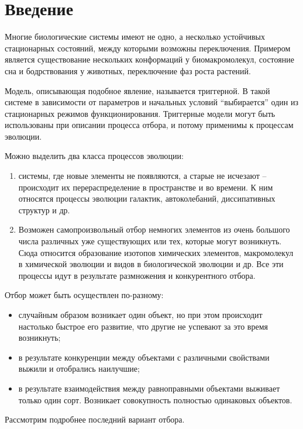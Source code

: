 \section*{Введение}

Многие биологические системы имеют не одно, а несколько устойчивых стационарных
состояний, между которыми возможны переключения. Примером является
существование нескольких конформаций у биомакромолекул, состояние сна и
бодрствования у животных, переключение фаз роста растений.

Модель, описывающая подобное явление, называется триггерной. В такой системе
в зависимости от параметров и начальных условий ``выбирается'' один из
стационарных режимов функционирования. Триггерные модели могут быть
использованы при описании процесса отбора, и потому применимы к процессам
эволюции.

Можно выделить два класса процессов эволюции:
\begin{enumerate}
    \item системы, где новые элементы не появляются, а старые не исчезают --
    происходит их перераспределение в пространстве и во времени. К ним
    относятся процессы эволюции галактик, автоколебаний, диссипативных структур
    и др.
    \item Возможен самопроизвольный отбор немногих элементов из очень большого
    числа различных уже существующих или тех, которые могут возникнуть. Сюда
    относится образование изотопов химических элементов, макромолекул в
    химической эволюции и видов в биологической эволюции и др. Все эти процессы
    идут в результате размножения и конкурентного отбора.
\end{enumerate}

Отбор может быть осуществлен по-разному:
\begin{itemize}
    \item случайным образом возникает один объект, но при этом происходит
    настолько быстрое его развитие, что другие не успевают за это время
    возникнуть;
    \item в результате конкуренции между объектами с различными свойствами
    выжили и отобрались наилучшие;
    \item в результате взаимодействия между равноправными объектами выживает
    только один сорт. Возникает совокупность полностью одинаковых объектов.
\end{itemize}
Рассмотрим подробнее последний вариант отбора.

\vspace*{2em} %

